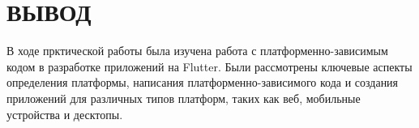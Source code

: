 \clearpage

\section*{ВЫВОД}

В ходе прктической работы была изучена работа
с платформенно-зависимым кодом в разработке приложений на Flutter.
Были рассмотрены ключевые аспекты определения платформы,
написания платформенно-зависимого кода
и создания приложений для различных типов платформ,
таких как веб, мобильные устройства и десктопы.


